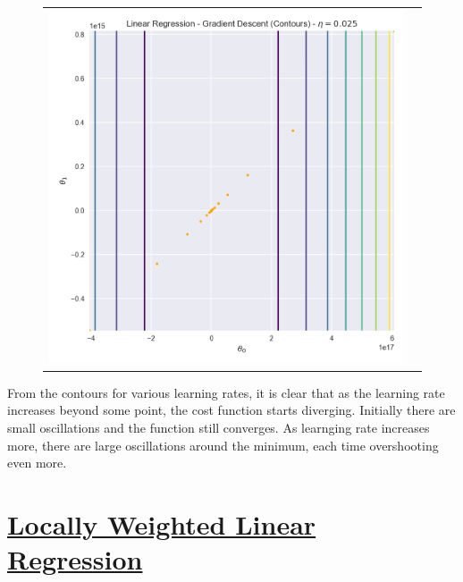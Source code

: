 \documentclass[12pt]{article}
\begin{document}
\begin{figure}[!htb]
\begin{tabular}{cc}
\includegraphics[scale=0.3]{linear10.png}
\end{tabular}
\end{figure}
\begin{addmargin}[0.3in]{0in}
From the contours for various learning rates, it is clear that as the learning rate increases beyond some point, the cost function starts diverging. Initially there are small oscillations and the function still converges. As learnging rate increases more, there are large oscillations around the minimum, each time overshooting even more.
\end{addmargin}

\newpage
\section*{\underline{Locally Weighted Linear Regression}}
\end{document}
